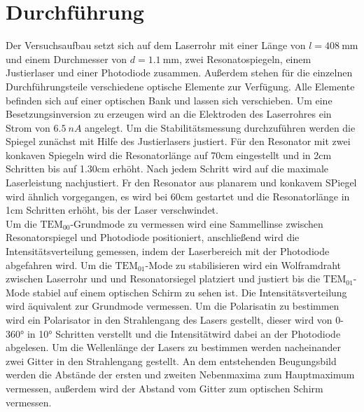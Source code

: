 \section{Durchführung}
\label{sec:Durchführung}
Der Versuchsaufbau setzt sich auf dem Laserrohr mit einer Länge von $l=\SI{408}{\mm}$ und einem
Durchmesser von $d=\SI{1.1}{\mm}$, zwei Resonatospiegeln, einem Justierlaser
und einer Photodiode zusammen. Außerdem stehen für die einzelnen Durchführungsteile verschiedene
optische Elemente zur Verfügung. Alle Elemente befinden sich auf einer optischen Bank und lassen
sich verschieben. Um eine Besetzungsinversion zu erzeugen wird an die Elektroden des Laserrohres ein
Strom von $\SI{6.5}{nA}$ angelegt.
Um die Stabilitätsmessung durchzuführen werden die Spiegel zunächst mit Hilfe des Justierlasers
justiert. Für den Resonator mit zwei konkaven Spiegeln wird die Resonatorlänge auf 70\;cm eingestellt
und in 2\;cm Schritten bis auf 1.30\;cm erhöht. Nach jedem Schritt wird auf die maximale Laserleistung nachjustiert.
Fr den Resonator aus planarem und konkavem SPiegel wird ähnlich vorgegangen, es wird bei 60\;cm gestartet und die
Resonatorlänge in 1\;cm Schritten erhöht, bis der Laser verschwindet.\\
Um die $\text{TEM}_{00}$-Grundmode zu vermessen wird eine Sammellinse zwischen Resonatorspiegel und Photodiode
positioniert, anschließend wird die Intensitätsverteilung gemessen, indem der Laserbereich mit der Photodiode
abgefahren wird. Um die $\text{TEM}_{01}$-Mode zu stabilisieren wird ein Wolframdraht zwischen Laserrohr und
und Resonatorsiegel platziert und justiert bis die $\text{TEM}_{01}$-Mode stabiel auf einem optischen Schirm zu sehen ist.
Die Intensitätsverteilung wird äquivalent zur Grundmode vermessen.
Um die Polarisatin zu bestimmen wird ein Polarisator in den Strahlengang des Lasers gestellt, dieser wird von
0-360° in 10° Schritten verstellt und die Intensitätwird dabei an der Photodiode abgelesen.
Um die Wellenlänge der Lasers zu bestimmen werden nacheinander zwei Gitter in den Strahlengang gestellt.
An dem entstehenden Beugungsbild werden die Abstände der ersten und zweiten Nebenmaxima zum Hauptmaximum vermessen,
außerdem wird der Abstand vom Gitter zum optischen Schirm vermessen.

